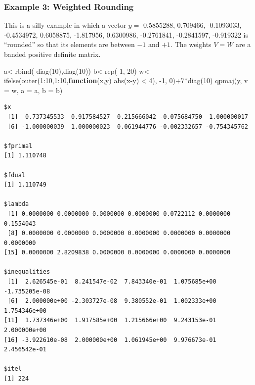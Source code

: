 \documentclass[
  12pt,
  letterpaper,
  DIV=11,
  numbers=noendperiod]{scrreprt}
\newenvironment{Shaded}{\begin{snugshade}}{\end{snugshade}}
\newcommand{\AttributeTok}[1]{\textcolor[rgb]{0.40,0.45,0.13}{#1}}
\newcommand{\ControlFlowTok}[1]{\textcolor[rgb]{0.00,0.23,0.31}{\textbf{#1}}}
\newcommand{\DecValTok}[1]{\textcolor[rgb]{0.68,0.00,0.00}{#1}}
\newcommand{\FunctionTok}[1]{\textcolor[rgb]{0.28,0.35,0.67}{#1}}
\newcommand{\NormalTok}[1]{\textcolor[rgb]{0.00,0.23,0.31}{#1}}
\newcommand{\OtherTok}[1]{\textcolor[rgb]{0.00,0.23,0.31}{#1}}
\newcommand{\SpecialCharTok}[1]{\textcolor[rgb]{0.37,0.37,0.37}{#1}}
\theoremstyle{remark}
\begin{document}
\subsubsection{Example 3: Weighted
Rounding}\label{example-3-weighted-rounding}

This is a silly example in which a vector \(y=\) 0.5855288, 0.709466,
-0.1093033, -0.4534972, 0.6058875, -1.817956, 0.6300986, -0.2761841,
-0.2841597, -0.919322 is ``rounded'' so that its elements are between
\(-1\) and \(+1\). The weights \(V=W\) are a banded positive definite
matrix.

\begin{Shaded}
\begin{Highlighting}[]
\NormalTok{a}\OtherTok{\textless{}{-}}\FunctionTok{rbind}\NormalTok{(}\SpecialCharTok{{-}}\FunctionTok{diag}\NormalTok{(}\DecValTok{10}\NormalTok{),}\FunctionTok{diag}\NormalTok{(}\DecValTok{10}\NormalTok{))}
\NormalTok{b}\OtherTok{\textless{}{-}}\FunctionTok{rep}\NormalTok{(}\SpecialCharTok{{-}}\DecValTok{1}\NormalTok{, }\DecValTok{20}\NormalTok{)}
\NormalTok{w}\OtherTok{\textless{}{-}}\FunctionTok{ifelse}\NormalTok{(}\FunctionTok{outer}\NormalTok{(}\DecValTok{1}\SpecialCharTok{:}\DecValTok{10}\NormalTok{,}\DecValTok{1}\SpecialCharTok{:}\DecValTok{10}\NormalTok{,}\ControlFlowTok{function}\NormalTok{(x,y) }\FunctionTok{abs}\NormalTok{(x}\SpecialCharTok{{-}}\NormalTok{y) }\SpecialCharTok{\textless{}} \DecValTok{4}\NormalTok{), }\SpecialCharTok{{-}}\DecValTok{1}\NormalTok{, }\DecValTok{0}\NormalTok{)}\SpecialCharTok{+}\DecValTok{7}\SpecialCharTok{*}\FunctionTok{diag}\NormalTok{(}\DecValTok{10}\NormalTok{)}
\FunctionTok{qpmaj}\NormalTok{(y, }\AttributeTok{v =}\NormalTok{ w, }\AttributeTok{a =}\NormalTok{ a, }\AttributeTok{b =}\NormalTok{ b)}
\end{Highlighting}
\end{Shaded}

\begin{verbatim}
$x
 [1]  0.737345533  0.917584527  0.215666042 -0.075684750  1.000000017
 [6] -1.000000039  1.000000023  0.061944776 -0.002332657 -0.754345762

$fprimal
[1] 1.110748

$fdual
[1] 1.110749

$lambda
 [1] 0.0000000 0.0000000 0.0000000 0.0000000 0.0722112 0.0000000 0.1554043
 [8] 0.0000000 0.0000000 0.0000000 0.0000000 0.0000000 0.0000000 0.0000000
[15] 0.0000000 2.8209838 0.0000000 0.0000000 0.0000000 0.0000000

$inequalities
 [1]  2.626545e-01  8.241547e-02  7.843340e-01  1.075685e+00 -1.735205e-08
 [6]  2.000000e+00 -2.303727e-08  9.380552e-01  1.002333e+00  1.754346e+00
[11]  1.737346e+00  1.917585e+00  1.215666e+00  9.243153e-01  2.000000e+00
[16] -3.922610e-08  2.000000e+00  1.061945e+00  9.976673e-01  2.456542e-01

$itel
[1] 224
\end{verbatim}
\end{document}
